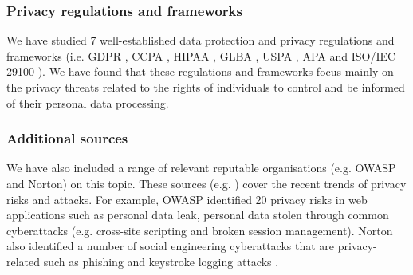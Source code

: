 

\subsubsection{Privacy regulations and frameworks}

We have studied 7 well-established data protection and privacy regulations and frameworks (i.e. GDPR \cite{OfficeJournaloftheEuropeanUnion;2016}, CCPA \cite{CCPA}, HIPAA \cite{HIPAA}, GLBA \cite{GLBA}, USPA \cite{US1974}, APA \cite{APA} and ISO/IEC 29100 \cite{ISO/IEC2011}). We have found that these regulations and frameworks focus mainly on the privacy threats related to the rights of individuals to control and be informed of their personal data processing. %

\subsubsection{Additional sources}
We have also included a range of relevant reputable organisations (e.g. OWASP and Norton) on this topic. These sources  (e.g. \cite{OWASP2020, Norton}) cover the recent trends of privacy risks and attacks. For example, OWASP identified 20 privacy risks in web applications \cite{OWASPsurvey} such as personal data leak, personal data stolen through common cyberattacks (e.g. cross-site scripting and broken session management). Norton also identified a number of social engineering cyberattacks that are privacy-related such as phishing and keystroke logging attacks \cite{Nortona}.

